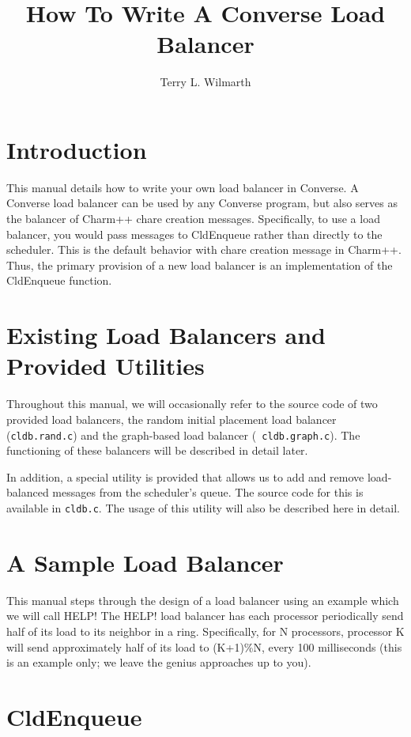 \documentclass[11pt]{article}
\title{How To Write A Converse Load Balancer}
\author{Terry L. Wilmarth}
\begin{document}
\maketitle

\section{Introduction}

This manual details how to write your own load balancer in Converse.
A Converse load balancer can be used by any Converse program, but also
serves as the balancer of Charm++ chare creation messages.
Specifically, to use a load balancer, you would pass messages to
CldEnqueue rather than directly to the scheduler.  This is the default
behavior with chare creation message in Charm++.  Thus, the primary
provision of a new load balancer is an implementation of the
CldEnqueue function.

\section{Existing Load Balancers and Provided Utilities}

Throughout this manual, we will occasionally refer to the source code
of two provided load balancers, the random initial placement load balancer
({\tt cldb.rand.c}) and the graph-based load balancer ({\tt
cldb.graph.c}).  The functioning of these balancers will be described
in detail later.

In addition, a special utility is provided that allows us to add and
remove load-balanced messages from the scheduler's queue.  The source
code for this is available in {\tt cldb.c}.  The usage of this utility
will also be described here in detail.

\section{A Sample Load Balancer}

This manual steps through the design of a load balancer using an
example which we will call HELP!  The HELP! load balancer has each processor
periodically send half of its load to its neighbor in a ring.
Specifically, for N processors, processor K will send approximately half of
its load to (K+1)\%N, every 100 milliseconds (this is an example only;
we leave the genius approaches up to you).

\section{CldEnqueue}
\end{document}
